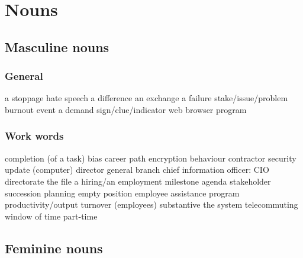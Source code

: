 \section*{Nouns}
\subsection*{Masculine nouns}
\subsubsection*{General}
   {a stoppage}
   {hate speech}
   {a difference}
   {an exchange}
   {a failure}
   {stake/issue/problem}
 {burnout}
   {event}
   {a demand}
   {sign/clue/indicator}
   {web browser}
   {program}
\subsubsection*{Work words}
   {completion (of a task)}
   {bias}
   {career path}
   {encryption}
   {behaviour}
   {contractor}
   {security update (computer)}
   {director general}
   {branch}
   {chief information officer: CIO}
   {directorate}
   {the file}
   {a hiring/an employment}
   {milestone}
   {agenda}
   {stakeholder}
   {succession planning}
   {empty position}
   {employee assistance program}
   {productivity/output}
   {turnover (employees)}
   {substantive}
   {the system}
   {telecommuting}
   {window of time}
   {part-time}
\subsection*{Feminine nouns}
